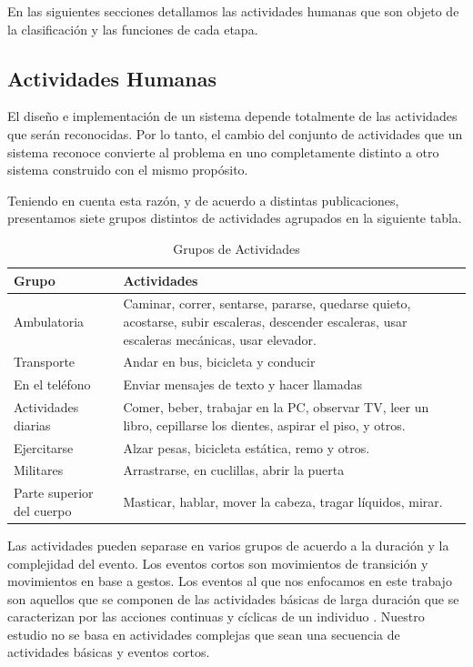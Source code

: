En las siguientes secciones detallamos las actividades humanas que
son objeto de la clasificación y las funciones de cada etapa.

\subsection{Actividades Humanas}

\label{sec263:actividades-humanas} El diseño e implementación de
un sistema  depende totalmente de las actividades que serán
reconocidas. Por lo tanto, el cambio del conjunto de actividades que
un sistema reconoce convierte al problema en uno completamente distinto
a otro sistema construido con el mismo propósito.

Teniendo en cuenta esta razón, y de acuerdo a distintas publicaciones,
presentamos siete grupos distintos de actividades agrupados en la
siguiente tabla.

\begin{table}[htbp]
\centering{}%
\begin{tabular}{|l|p{9cm}|}
\hline 
\textbf{Grupo}  & \textbf{Actividades} \tabularnewline
\hline 
\hline 
Ambulatoria  & Caminar, correr, sentarse, pararse, quedarse quieto, acostarse, subir
escaleras, descender escaleras, usar escaleras mecánicas, usar elevador.\tabularnewline
\hline 
Transporte  & Andar en bus, bicicleta y conducir \tabularnewline
\hline 
En el teléfono  & Enviar mensajes de texto y hacer llamadas \tabularnewline
\hline 
Actividades diarias  & Comer, beber, trabajar en la PC, observar TV, leer un libro, cepillarse
los dientes, aspirar el piso, y otros. \tabularnewline
\hline 
Ejercitarse  & Alzar pesas, bicicleta estática, remo y otros. \tabularnewline
\hline 
Militares  & Arrastrarse, en cuclillas, abrir la puerta \tabularnewline
\hline 
Parte superior del cuerpo  & Masticar, hablar, mover la cabeza, tragar líquidos, mirar. \tabularnewline
\hline 
\end{tabular}\caption[Grupos de Actividades]{\label{tab2:grupo-actividades}Grupos de Actividades}
\end{table}

Las actividades pueden separase en varios grupos de acuerdo a la duración
y la complejidad del evento. Los eventos cortos son movimientos de
transición y movimientos en base a gestos. Los eventos al que nos
enfocamos en este trabajo son aquellos que se componen de las actividades
básicas de larga duración que se caracterizan por las acciones continuas
y cíclicas de un individuo \cite{ReyesOrtiz2015}. Nuestro estudio
no se basa en actividades complejas que sean una secuencia de actividades
básicas y eventos cortos.

